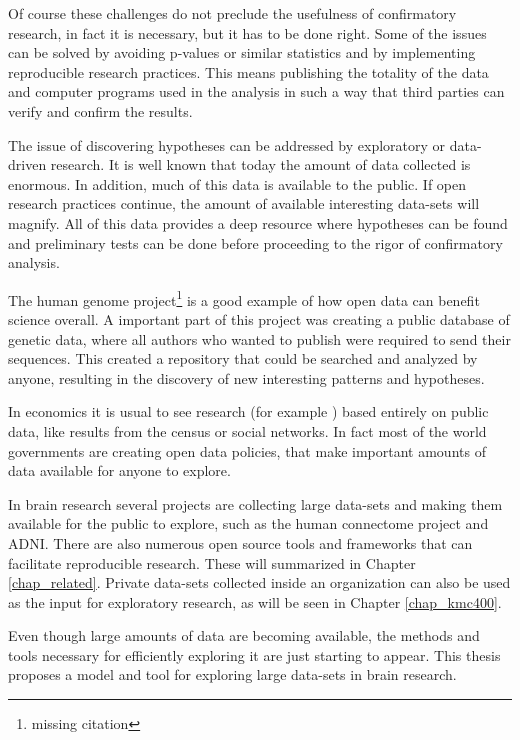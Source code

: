 Of course these challenges do not preclude the usefulness of confirmatory research, in fact it is necessary, but it has to be done right. Some of the issues can be solved by avoiding p-values or similar statistics and by implementing reproducible research practices. This means publishing the totality of the data and computer programs used in the analysis in such a way that third parties can verify and confirm the results. 

The issue of discovering hypotheses can be addressed by exploratory or data-driven research. It is well known that today the amount of data collected is enormous. In addition, much of this data is available to the public. If open research practices continue, the amount of available interesting data-sets will magnify. All of this data provides a deep resource where hypotheses can be found and preliminary tests can be done before proceeding to the rigor of confirmatory analysis. 

The human genome project\footnote{missing citation} is a good example of how open data can benefit science overall. A important part of this project was creating a public database of genetic data, where all authors who wanted to publish were required to send their sequences. This created a repository that could be searched and analyzed by anyone, resulting in the discovery of new interesting patterns and hypotheses.

In economics it is usual to see research (for example \autocite{levitt_freakonomics_2006}) based entirely on public data, like results from the census or social networks. In fact most of the world governments are creating open data policies, that make important amounts of data available for anyone to explore.

In brain research several projects are collecting large data-sets and making them available for the public to explore, such as the human connectome project\autocite{rosen_human_2010} and ADNI\autocite{jack_alzheimers_2008}. There are also numerous open source tools and frameworks that can facilitate reproducible research. These will summarized in Chapter \ref{chap_related}. Private data-sets collected inside an organization can also be used as the input for exploratory research, as will be seen in Chapter \ref{chap_kmc400}.

Even though large amounts of data are becoming available, the methods and tools necessary for efficiently exploring it are just starting to appear. This thesis proposes a model and tool for exploring large data-sets in brain research. 


